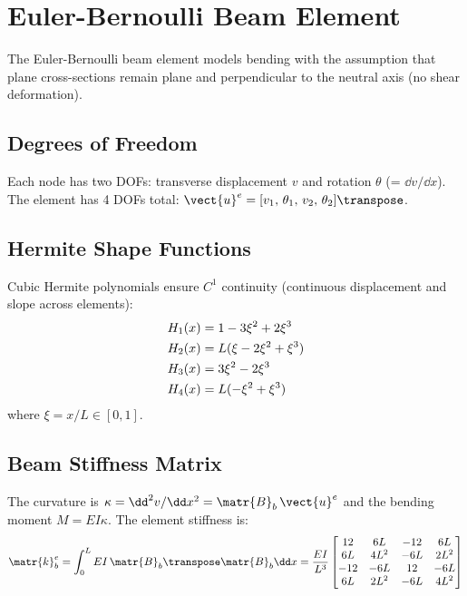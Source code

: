 \section{Euler-Bernoulli Beam Element}

The Euler-Bernoulli beam element models bending with the assumption that
plane cross-sections remain plane and perpendicular to the neutral axis
(no shear deformation).

\subsection{Degrees of Freedom}

Each node has two DOFs: transverse displacement $v$ and rotation $\theta$
(= $\dd v/\dd x$). The element has 4 DOFs total:
$\vect{u}^e = [v_1,\, \theta_1,\, v_2,\, \theta_2]\transpose$.

\subsection{Hermite Shape Functions}

Cubic Hermite polynomials ensure $C^1$ continuity (continuous displacement
and slope across elements):
\begin{align}
    H_1(x) &= 1 - 3\xi^2 + 2\xi^3 \notag \\
    H_2(x) &= L(\xi - 2\xi^2 + \xi^3) \notag \\
    H_3(x) &= 3\xi^2 - 2\xi^3 \notag \\
    H_4(x) &= L(-\xi^2 + \xi^3)
    \label{eq:hermite}
\end{align}
where $\xi = x/L \in [0,1]$.

\subsection{Beam Stiffness Matrix}

The curvature is $\kappa = \dd^2 v/\dd x^2 = \matr{B}_b\, \vect{u}^e$ and the
bending moment $M = EI\kappa$. The element stiffness is:
\begin{equation}
    \matr{k}^e_b = \int_0^L EI\, \matr{B}_b\transpose \matr{B}_b \dd x
    = \frac{EI}{L^3}
    \begin{bmatrix}
         12  &  6L  & -12  &  6L  \\
         6L  &  4L^2 & -6L  &  2L^2 \\
        -12  & -6L  &  12  & -6L  \\
         6L  &  2L^2 & -6L  &  4L^2
    \end{bmatrix}
    \label{eq:beam_stiffness}
\end{equation}

